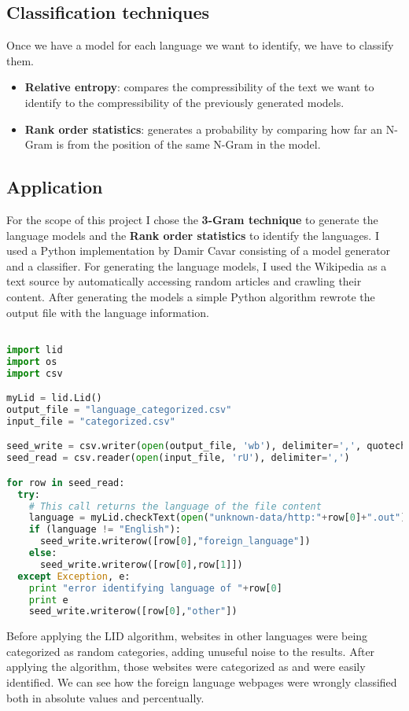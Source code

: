 \subsection{Classification techniques}
Once we have a model for each language we want to identify, we have to classify them.
\begin{itemize}
  \item {\bf Relative entropy}: compares the compressibility of the text we want to identify to the compressibility of the previously generated models.
  \item {\bf Rank order statistics}: generates a probability by comparing how far an N-Gram is from the position of the same N-Gram in the model.
\end{itemize}
\subsection{Application}
For the scope of this project I chose the {\bf 3-Gram technique} to generate the language models and the {\bf Rank order statistics} to identify the languages. I used a Python implementation by Damir Cavar\cite{lid1} consisting of a model generator and a classifier.
For generating the language models, I used the Wikipedia as a text source by automatically accessing random articles and crawling their content. After generating the models a simple Python algorithm rewrote the output file with the language information.

\begin{lstlisting}[language=Python]

import lid
import os
import csv

myLid = lid.Lid()
output_file = "language_categorized.csv"
input_file = "categorized.csv"

seed_write = csv.writer(open(output_file, 'wb'), delimiter=',', quotechar='|', quoting=csv.QUOTE_MINIMAL)
seed_read = csv.reader(open(input_file, 'rU'), delimiter=',')

for row in seed_read:
  try:
    # This call returns the language of the file content
    language = myLid.checkText(open("unknown-data/http:"+row[0]+".out").read())
    if (language != "English"):
      seed_write.writerow([row[0],"foreign_language"])
    else:
      seed_write.writerow([row[0],row[1]])
  except Exception, e:
    print "error identifying language of "+row[0]
    print e
    seed_write.writerow([row[0],"other"])
\end{lstlisting}

Before applying the LID algorithm, websites in other languages were being categorized as random categories, adding unuseful noise to the results. After applying the algorithm, those websites were categorized as  and were easily identified. We can see how the foreign language webpages were wrongly classified both in absolute values and percentually.

